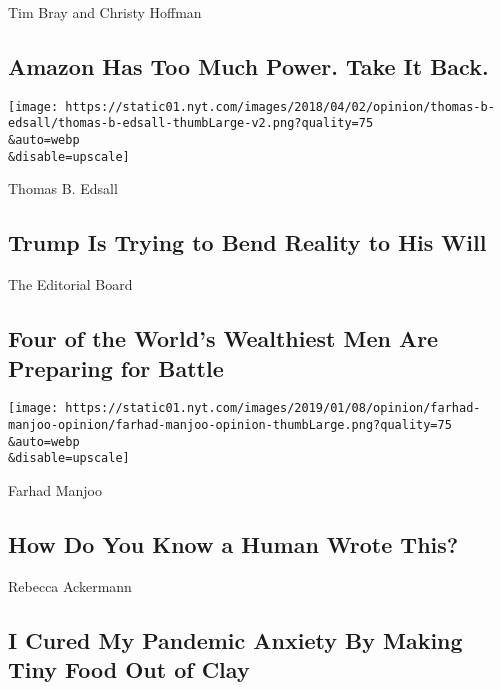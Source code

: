 Tim Bray and Christy Hoffman

\hypertarget{amazon-has-too-much-power-take-it-back}{%
\subsection{Amazon Has Too Much Power. Take It
Back.}\label{amazon-has-too-much-power-take-it-back}}

\href{/2020/07/29/opinion/trump-2020-populism.html}{}

\texttt{[image: https://static01.nyt.com/images/2018/04/02/opinion/thomas-b-edsall/thomas-b-edsall-thumbLarge-v2.png?quality=75\\\&auto=webp\\\&disable=upscale]}

Thomas B. Edsall

\hypertarget{trump-is-trying-to-bend-reality-to-his-will}{%
\subsection{Trump Is Trying to Bend Reality to His
Will}\label{trump-is-trying-to-bend-reality-to-his-will}}

\href{/2020/07/28/opinion/tech-ceo-hearing-congress.html}{}

The Editorial Board

\hypertarget{four-of-the-worlds-wealthiest-men-are-preparing-for-battle}{%
\subsection{Four of the World's Wealthiest Men Are Preparing for
Battle}\label{four-of-the-worlds-wealthiest-men-are-preparing-for-battle}}

\href{/2020/07/29/opinion/gpt-3-ai-automation.html}{}

\texttt{[image: https://static01.nyt.com/images/2019/01/08/opinion/farhad-manjoo-opinion/farhad-manjoo-opinion-thumbLarge.png?quality=75\\\&auto=webp\\\&disable=upscale]}

Farhad Manjoo

\hypertarget{how-do-you-know-a-human-wrote-this}{%
\subsection{How Do You Know a Human Wrote
This?}\label{how-do-you-know-a-human-wrote-this}}

\href{/2020/07/29/opinion/food-covid-quarantine-clay.html}{}

Rebecca Ackermann

\hypertarget{i-cured-my-pandemic-anxiety-by-making-tiny-food-out-of-clay}{%
\subsection{I Cured My Pandemic Anxiety By Making Tiny Food Out of
Clay}\label{i-cured-my-pandemic-anxiety-by-making-tiny-food-out-of-clay}}

